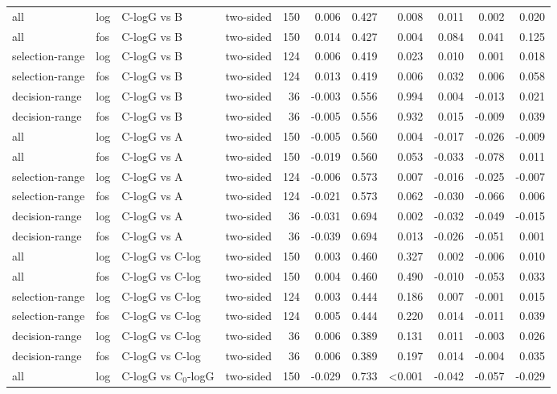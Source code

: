 \begin{longtable}{llllrrrrrrr}
all & log & C-logG vs B & two-sided & 150 & 0.006 & 0.427 & 0.008 & 0.011 & 0.002 & 0.020 \\
all & fos & C-logG vs B & two-sided & 150 & 0.014 & 0.427 & 0.004 & 0.084 & 0.041 & 0.125 \\
selection-range & log & C-logG vs B & two-sided & 124 & 0.006 & 0.419 & 0.023 & 0.010 & 0.001 & 0.018 \\
selection-range & fos & C-logG vs B & two-sided & 124 & 0.013 & 0.419 & 0.006 & 0.032 & 0.006 & 0.058 \\
decision-range & log & C-logG vs B & two-sided & 36 & -0.003 & 0.556 & 0.994 & 0.004 & -0.013 & 0.021 \\
decision-range & fos & C-logG vs B & two-sided & 36 & -0.005 & 0.556 & 0.932 & 0.015 & -0.009 & 0.039 \\
all & log & C-logG vs A & two-sided & 150 & -0.005 & 0.560 & 0.004 & -0.017 & -0.026 & -0.009 \\
all & fos & C-logG vs A & two-sided & 150 & -0.019 & 0.560 & 0.053 & -0.033 & -0.078 & 0.011 \\
selection-range & log & C-logG vs A & two-sided & 124 & -0.006 & 0.573 & 0.007 & -0.016 & -0.025 & -0.007 \\
selection-range & fos & C-logG vs A & two-sided & 124 & -0.021 & 0.573 & 0.062 & -0.030 & -0.066 & 0.006 \\
decision-range & log & C-logG vs A & two-sided & 36 & -0.031 & 0.694 & 0.002 & -0.032 & -0.049 & -0.015 \\
decision-range & fos & C-logG vs A & two-sided & 36 & -0.039 & 0.694 & 0.013 & -0.026 & -0.051 & 0.001 \\
all & log & C-logG vs C-log & two-sided & 150 & 0.003 & 0.460 & 0.327 & 0.002 & -0.006 & 0.010 \\
all & fos & C-logG vs C-log & two-sided & 150 & 0.004 & 0.460 & 0.490 & -0.010 & -0.053 & 0.033 \\
selection-range & log & C-logG vs C-log & two-sided & 124 & 0.003 & 0.444 & 0.186 & 0.007 & -0.001 & 0.015 \\
selection-range & fos & C-logG vs C-log & two-sided & 124 & 0.005 & 0.444 & 0.220 & 0.014 & -0.011 & 0.039 \\
decision-range & log & C-logG vs C-log & two-sided & 36 & 0.006 & 0.389 & 0.131 & 0.011 & -0.003 & 0.026 \\
decision-range & fos & C-logG vs C-log & two-sided & 36 & 0.006 & 0.389 & 0.197 & 0.014 & -0.004 & 0.035 \\
all & log & C-logG vs C$_0$-logG & two-sided & 150 & -0.029 & 0.733 & <0.001 & -0.042 & -0.057 & -0.029 \\

\end{longtable}
